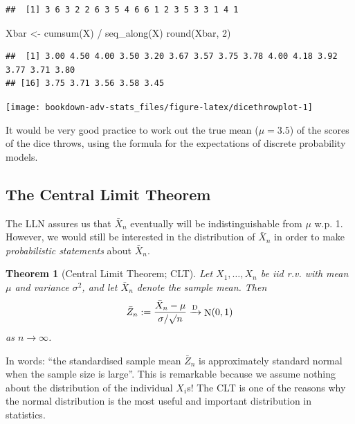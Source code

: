 \documentclass[
]{book}
\newenvironment{Shaded}{\begin{snugshade}}{\end{snugshade}}
\newcommand{\DecValTok}[1]{\textcolor[rgb]{0.00,0.00,0.81}{#1}}
\newcommand{\FunctionTok}[1]{\textcolor[rgb]{0.00,0.00,0.00}{#1}}
\newcommand{\NormalTok}[1]{#1}
\newcommand{\OtherTok}[1]{\textcolor[rgb]{0.56,0.35,0.01}{#1}}
\newcommand{\SpecialCharTok}[1]{\textcolor[rgb]{0.00,0.00,0.00}{#1}}
\DeclareMathOperator{\N}{N}
\newtheorem{theorem}{Theorem}[chapter]
\theoremstyle{definition}
\theoremstyle{definition}
\theoremstyle{definition}
\theoremstyle{definition}
\theoremstyle{remark}
\begin{document}
\begin{verbatim}
##  [1] 3 6 3 2 2 6 3 5 4 6 6 1 2 3 5 3 3 1 4 1
\end{verbatim}

\begin{Shaded}
\begin{Highlighting}[]
\NormalTok{Xbar }\OtherTok{\textless{}{-}} \FunctionTok{cumsum}\NormalTok{(X) }\SpecialCharTok{/} \FunctionTok{seq\_along}\NormalTok{(X)}
\FunctionTok{round}\NormalTok{(Xbar, }\DecValTok{2}\NormalTok{)}
\end{Highlighting}
\end{Shaded}

\begin{verbatim}
##  [1] 3.00 4.50 4.00 3.50 3.20 3.67 3.57 3.75 3.78 4.00 4.18 3.92 3.77 3.71 3.80
## [16] 3.75 3.71 3.56 3.58 3.45
\end{verbatim}

\begin{center}\texttt{[image: bookdown-adv-stats\_files/figure-latex/dicethrowplot-1]} \end{center}

It would be very good practice to work out the true mean (\(\mu=3.5\)) of the scores of the dice throws, using the formula for the expectations of discrete probability models.

\hypertarget{the-central-limit-theorem}{%
\subsection{The Central Limit Theorem}\label{the-central-limit-theorem}}

The LLN assures us that \(\bar X_n\) eventually will be indistinguishable from \(\mu\) w.p. 1.
However, we would still be interested in the distribution of \(\bar X_n\) in order to make \emph{probabilistic statements} about \(\bar X_n\).

\begin{theorem}[Central Limit Theorem; CLT]
Let \(X_1,\dots,X_n\) be iid r.v. with mean \(\mu\) and variance \(\sigma^2\), and let \(\bar X_n\) denote the sample mean. Then
\[
\bar Z_n := \frac{\bar X_n - \mu}{\sigma/\surd n} \xrightarrow{\text D} \N(0,1)
\]
as \(n\to \infty\).
\end{theorem}

In words: ``the standardised sample mean \(\bar Z_n\) is approximately standard normal when the sample size is large''.
This is remarkable because we assume nothing about the distribution of the individual \(X_i\)s!
The CLT is one of the reasons why the normal distribution is the most useful and important distribution in statistics.
\end{document}
